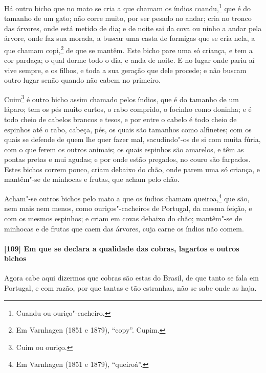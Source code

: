 \begin{linenumbers}
Há outro bicho que no mato se cria a que chamam os índios coandu,\footnote{ Cuandu ou
ouriço"-cacheiro.} que é do tamanho de um gato; não corre muito, por ser pesado no andar;
cria no tronco das árvores, onde está metido de dia; e de noite sai da cova ou ninho a
andar pela árvore, onde faz sua morada, a buscar uma casta de formigas que se cria nela, a
que chamam copi,\footnote{ Em Varnhagen (1851 e 1879), ``copy''. Cupim.} de que se mantêm.
Este bicho pare uma só criança, e tem a cor pardaça; o qual dorme todo o dia, e anda de
noite. E no lugar onde pariu aí vive sempre, e os filhos, e toda a sua geração que dele
procede; e não buscam outro lugar senão quando não cabem no primeiro.

Cuim\footnote{ Cuim ou ouriço.} é outro bicho assim chamado pelos índios, que é do tamanho
de um láparo; tem os pés muito curtos, o rabo comprido, o focinho como doninha; e é todo
cheio de cabelos brancos e tesos, e por entre o cabelo é todo cheio de espinhos até o
rabo, cabeça, pés, os quais são tamanhos como alfinetes; com os quais se defende de quem
lhe quer fazer mal, sacudindo"-os de si com muita fúria, com o que ferem os outros animais;
os quais espinhos são amarelos, e têm as pontas pretas e mui agudas; e por onde estão
pregados, no couro são farpados. Estes bichos correm pouco, criam debaixo do chão, onde
parem uma só criança, e mantêm"-se de minhocas e frutas, que acham pelo chão.

Acham"-se outros bichos pelo mato a que os índios chamam queiroa,\footnote{ Em Varnhagen
(1851 e 1879), ``queiroá''.} que são, nem mais nem menos, como ouriços"-cacheiros de
Portugal, da mesma feição, e com os mesmos espinhos; e criam em covas debaixo do chão;
mantêm"-se de minhocas e de frutas que caem das árvores, cuja carne os índios não comem.

\paragraph{[109] Em que se declara a qualidade das cobras, lagartos e outros bichos}\quad
Agora cabe aqui dizermos que cobras são estas do Brasil, de que tanto se fala em Portugal,
e com razão, por que tantas e tão estranhas, não se sabe onde as haja.


\end{linenumbers}

